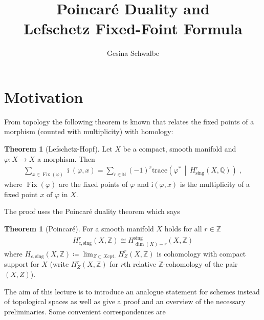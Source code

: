 \documentclass[english]{scrartcl}
\theoremstyle{definition}
\newtheorem{Thm}[Def]{Theorem}
\theoremstyle{remark}
\newcommand*{\N}{\mathds{N}}
\newcommand*{\Z}{\mathds{Z}}
\newcommand*{\Q}{\mathds{Q}}
\newcommand*{\trace}[2]{\text{trace}\left(#1 \,\middle|\, #2 \right)} %
\renewcommand*{\phi}{\varphi}
\begin{document}
\clearpairofpagestyles
{}
\cfoot*{\pagemark}

\title{Poincaré Duality and\\
  Lefschetz Fixed-Foint Formula}
\subject{Seminar:
  Deligne's proof of the Weil Conjecture%
}
\author{Gesina Schwalbe}
\maketitle
\tableofcontents

\section{Motivation}
From topology the following theorem is known that relates the fixed
points of a morphism (counted with multiplicity) with homology:
\begin{Thm}[Lefschetz-Hopf]
  Let $X$ be a compact, smooth manifold and
  $\phi\colon X\to X$ a morphism. Then
  \begin{gather*}
    \sum_{x\in\operatorname{Fix}(\phi)} \operatorname{i}(\phi,x)
    =\sum_{r\in\N}(-1)^r \trace{\phi^*}{H_\text{sing}^r(X,\Q)}\;,
  \end{gather*}
  where $\operatorname{Fix}(\phi)$ are the fixed points of $\phi$ and
  $\mathrm i(\phi,x)$ is the multiplicity of a fixed point $x$ of $\phi$
  in $X$.
\end{Thm}
The proof uses the Poincaré duality theorem which says
\begin{Thm}[Poincaré]
  For a smooth manifold $X$ holds for all $r\in\Z$
  \begin{gather*}
    H_{c,\text{sing}}^r(X,\Z) \cong H_{\dim(X)-r}^{\text{sing}}(X,\Z)
  \end{gather*}
  where $H_{c,\text{sing}}(X,\Z)\coloneqq
  \lim_{Z\subset X \text{cpt.}}H_Z^r(X,\Z)$
  is cohomology with compact support for $X$
  (write $H_Z^r(X,\Z)$ for $r$th relative $\Z$-cohomology of the pair $(X,Z)$).
\end{Thm}
The aim of this lecture is to introduce an analogue statement for
schemes instead of topological spaces as well as give a proof and an
overview of the necessary preliminaries.
Some convenient correspondences are
\end{document}
